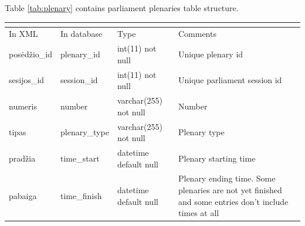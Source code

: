 \documentclass[a4paper,12pt]{article}
\begin{document}
	\noindent
	Table \ref{tab:plenary} contains parliament plenaries table structure.
	\begin{center}
		\begin{tabular}{L{3cm} L{3cm} L{2.2cm} L{3.8cm}}
			\\ 
			\hline
			In XML & In database & Type & Comments\\
			\hline
			posėdžio\_id & plenary\_id & int(11) not null & Unique plenary id \\
			sesijos\_id & session\_id & int(11) not null & Unique parliament session id \\
			numeris & number & varchar(255) not null & Number \\ 
			tipas & plenary\_type & varchar(255) not null & Plenary type \\ 
			pradžia & time\_start & datetime default null & Plenary starting time \\
			pabaiga & time\_finish & datetime default null & Plenary ending time. Some plenaries are not yet finished and some entries don't include times at all \\
			\hline
		\end{tabular}
		 \label{tab:plenary}
	\end{center}
	
	\hfill
\end{document}
